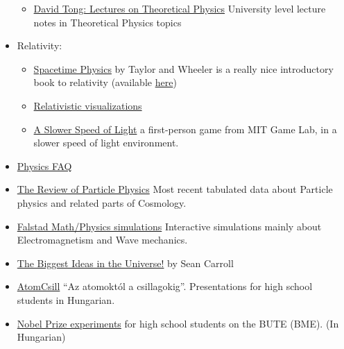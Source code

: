 \documentclass{article}
\begin{document}
\begin{itemize}
\begin{itemize}
    \item \href{https://www.damtp.cam.ac.uk/user/tong/teaching.html}{David Tong: Lectures on Theoretical Physics} University level lecture notes in Theoretical Physics topics
    
\end{itemize}

\item Relativity:

\begin{itemize}
    \item \href{https://www.goodreads.com/book/show/1000529.Spacetime_Physics}{Spacetime Physics} by Taylor and Wheeler is a really nice introductory book to relativity (available \href{http://www.gvp.cz/~vinkle/mafynet/_F/str/151621272-Spacetime-Physics-2nd-Ed-Taylor-Wheeler-0716723271.pdf}{here})

    \item \href{https://www.spacetimetravel.org/}{Relativistic visualizations}
    
    \item \href{http://gamelab.mit.edu/games/a-slower-speed-of-light/}{A Slower Speed of Light} a first-person game from MIT Game Lab, in a slower speed of light environment.
    
\end{itemize}

\item \href{https://math.ucr.edu/home/baez/physics/index.html}{Physics FAQ}

\item \href{http://pdg.lbl.gov/}{The Review of Particle Physics} Most recent tabulated data about Particle physics and related parts of Cosmology.

\item \href{https://www.falstad.com/mathphysics.html}{Falstad Math/Physics simulations} Interactive simulations mainly about Electromagnetism and Wave mechanics.


\item \href{https://www.youtube.com/playlist?list=PLrxfgDEc2NxZJcWcrxH3jyjUUrJlnoyzX}{The Biggest Ideas in the Universe!} by Sean Carroll 

\item \href{http://atomcsill.elte.hu/}{AtomCsill} ``Az atomoktól a csillagokig''. Presentations for high school students in Hungarian.

\item \href{http://felvi.physics.bme.hu/nobeldijas}{Nobel Prize experiments} for high school students on the BUTE (BME). (In Hungarian)


\end{itemize}
\end{document}
